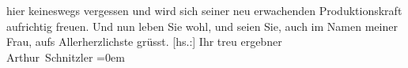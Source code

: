 \begin{ledgroupsized}[t]{13cm}
               hier keineswegs vergessen\strikeout{,} und wird sich seiner neu
               erwachenden Produktionskraft aufrichtig freuen.\pend
           \pstart
           Und nun leben Sie wohl, und seien Sie, auch im Namen meiner Frau, aufs Allerherzlichste grüsst.\pend
           \pstart
           {[}hs.:{]} Ihr treu ergebner{\\[\baselineskip]}\spacefill\mbox{Arthur Schnitzler}\pend
           \leftskip=0em{}          \endnumbering{}\end{ledgroupsized}  \newcommand{\dateiname}{L02222}\newcommand{\titel}{Arthur Schnitzler an Georg Brandes, 9. 12. 1915}\newcommand{\editorInnen}{ Martin Anton Müller und Gerd-Hermann Susen}
            \footnotesize
\begin{ledgroupsized}[t]{11.5cm}
\end{ledgroupsized}
         
      